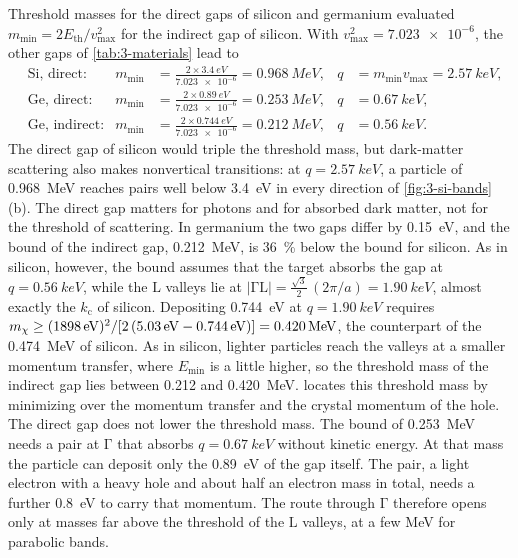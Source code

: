 \begin{workedexample}{Threshold masses for the direct gaps of silicon and germanium}\label{we:3-mmin}
 evaluated $m_{\mathrm{min}} = 2E_{\mathrm{th}}/v_{\mathrm{max}}^2$ for the indirect gap of silicon. With $v_{\mathrm{max}}^2 = \num{7.023e-6}$, the other gaps of \cref{tab:3-materials} lead to
\begin{equation*}
  \begin{aligned}
  &\text{Si, direct:} & m_{\mathrm{min}} &= \frac{2\times\SI{3.4}{eV}}{\num{7.023e-6}} = \SI{0.968}{MeV}, & q &= m_{\mathrm{min}}v_{\mathrm{max}} = \SI{2.57}{keV}, \\
  &\text{Ge, direct:} & m_{\mathrm{min}} &= \frac{2\times\SI{0.89}{eV}}{\num{7.023e-6}} = \SI{0.253}{MeV}, & q &= \SI{0.67}{keV}, \\
  &\text{Ge, indirect:} & m_{\mathrm{min}} &= \frac{2\times\SI{0.744}{eV}}{\num{7.023e-6}} = \SI{0.212}{MeV}, & q &= \SI{0.56}{keV}.
  \end{aligned}
\end{equation*}
The direct gap of silicon would triple the threshold mass, but dark-matter scattering also makes nonvertical transitions: at $q = \SI{2.57}{keV}$, a particle of \SI{0.968}{MeV} reaches pairs well below \SI{3.4}{eV} in every direction of \cref{fig:3-si-bands}(b). The direct gap matters for photons and for absorbed dark matter, not for the threshold of scattering. In germanium the two gaps differ by \SI{0.15}{eV}, and the bound of the indirect gap, \SI{0.212}{MeV}, is \SI{36}{\percent} below the bound for silicon. As in silicon, however, the bound assumes that the target absorbs the gap at $q = \SI{0.56}{keV}$, while the $\mathrm{L}$ valleys lie at $|\mathrm{\Gamma}\mathrm{L}| = \tfrac{\sqrt3}{2}\,(2\pi/a) = \SI{1.90}{keV}$, almost exactly the $k_{\mathrm{c}}$ of silicon. Depositing \SI{0.744}{eV} at $q = \SI{1.90}{keV}$ requires $m_{\chi} \ge (\SI{1898}{eV})^2/[2\,(\SI{5.03}{eV} - \SI{0.744}{eV})] = \SI{0.420}{MeV}$, the counterpart of the \SI{0.474}{MeV} of silicon. As in silicon, lighter particles reach the valleys at a smaller momentum transfer, where $E_{\mathrm{min}}$ is a little higher, so the threshold mass of the indirect gap lies between 0.212 and \SI{0.420}{MeV}.  locates this threshold mass by minimizing over the momentum transfer and the crystal momentum of the hole. The direct gap does not lower the threshold mass. The bound of \SI{0.253}{MeV} needs a pair at $\mathrm{\Gamma}$ that absorbs $q = \SI{0.67}{keV}$ without kinetic energy. At that mass the particle can deposit only the \SI{0.89}{eV} of the gap itself. The pair, a light electron with a heavy hole and about half an electron mass in total, needs a further \SI{0.8}{eV} to carry that momentum. The route through $\mathrm{\Gamma}$ therefore opens only at masses far above the threshold of the $\mathrm{L}$ valleys, at a few MeV for parabolic bands.
\end{workedexample}

